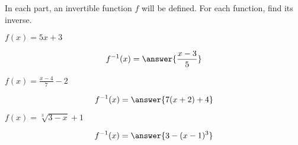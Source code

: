 \documentclass{ximera}
\author{Bobby Ramsey}
\begin{document}
	In each part, an invertible function $f$ will be defined. For each function, find its inverse.

	\begin{exercise}	
		$f(x) = 5x + 3$
		
		\[f^{-1}(x) = \answer{\frac{x-3}{5}}\]
	\end{exercise}
	
	\begin{exercise}	
		$f(x) = \frac{x - 4 }{7} - 2$
		
		\[f^{-1}(x) = \answer{7(x+2)+ 4}\]
	\end{exercise}

	\begin{exercise}			
		$f(x) = \sqrt[3]{3-x} + 1$
		
		\[f^{-1}(x) = \answer{3-(x - 1)^3}\]
	\end{exercise}
\end{document}
